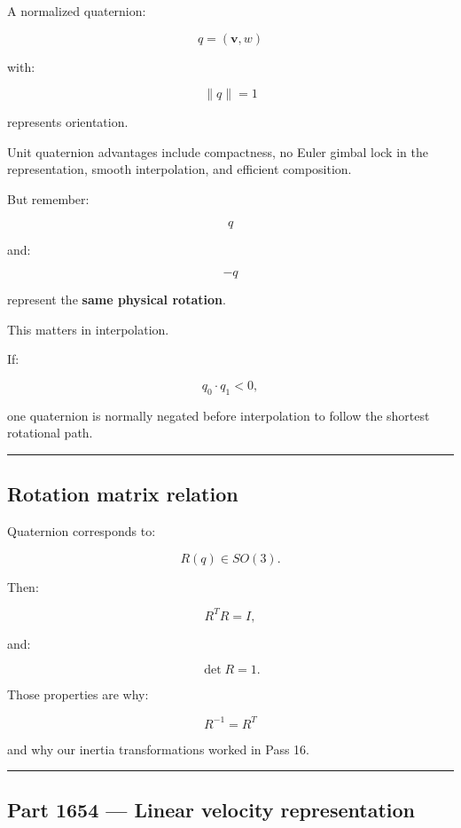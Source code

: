 A normalized quaternion:

\[
q=(\mathbf v,w)
\]

with:

\[
\|q\|=1
\]

represents orientation.

Unit quaternion advantages include compactness, no Euler gimbal lock in the representation, smooth interpolation, and efficient composition.

But remember:

\[
q
\]

and:

\[
-q
\]

represent the \textbf{same physical rotation}.

This matters in interpolation.

If:

\[
q_0\cdot q_1<0,
\]

one quaternion is normally negated before interpolation to follow the shortest rotational path.

\begin{center}\rule{0.5\linewidth}{0.5pt}\end{center}

\subsection{Rotation matrix relation}\label{06-engine-ii-ch037-rotation-matrix-relation}

Quaternion corresponds to:

\[
R(q)\in SO(3).
\]

Then:

\[
R^TR=I,
\]

and:

\[
\det R=1.
\]

Those properties are why:

\[
R^{-1}=R^T
\]

and why our inertia transformations worked in Pass 16.

\begin{center}\rule{0.5\linewidth}{0.5pt}\end{center}

\subsection{Part 1654 --- Linear velocity representation}\label{06-engine-ii-ch037-part-1654-linear-velocity-representation}

